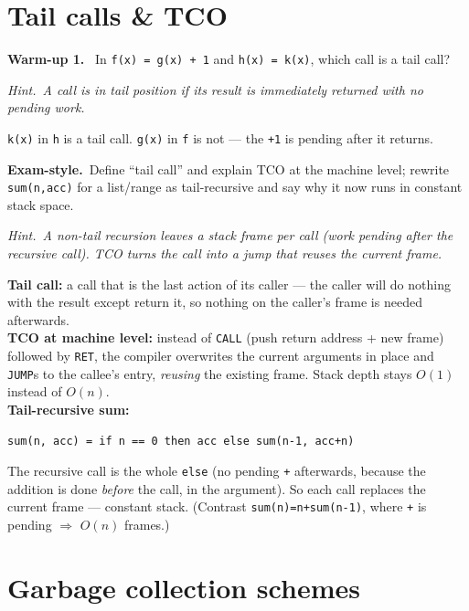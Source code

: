 \documentclass[11pt,a4paper]{article}
\newcommand{\hint}[1]{\par{\small\textcolor{accent}{\textit{Hint.}}\ \textit{#1}}\par\smallskip}
\newcommand{\warm}[1]{\smallskip\textbf{\textcolor{hi}{Warm-up #1.}}\ }
\newcommand{\exam}{\smallskip\textbf{\textcolor{warn}{Exam-style.}}\ }
\begin{document}
\section{Tail calls \& TCO}

\warm{1} In \texttt{f(x) = g(x) + 1} and \texttt{h(x) = k(x)}, which call is a tail call?
\hint{A call is in tail position if its result is \emph{immediately} returned with no pending work.}
\begin{sol}
\texttt{k(x)} in \texttt{h} is a tail call. \texttt{g(x)} in \texttt{f} is not --- the \texttt{+1} is pending after it returns.
\end{sol}

\exam Define ``tail call'' and explain TCO at the machine level; rewrite \texttt{sum(n,acc)} for a list/range as tail-recursive and say why it now runs in constant stack space.
\hint{A non-tail recursion leaves a stack frame per call (work pending after the recursive call). TCO turns the call into a jump that \emph{reuses} the current frame.}
\begin{sol}
\textbf{Tail call:} a call that is the last action of its caller --- the caller will do nothing with the result except return it, so nothing on the caller's frame is needed afterwards.\\[2pt]
\textbf{TCO at machine level:} instead of \texttt{CALL} (push return address + new frame) followed by \texttt{RET}, the compiler overwrites the current arguments in place and \texttt{JUMP}s to the callee's entry, \emph{reusing} the existing frame. Stack depth stays $O(1)$ instead of $O(n)$.\\[2pt]
\textbf{Tail-recursive sum:}
\begin{verbatim}
sum(n, acc) = if n == 0 then acc else sum(n-1, acc+n)
\end{verbatim}
The recursive call is the whole \texttt{else} (no pending \texttt{+} afterwards, because the addition is done \emph{before} the call, in the argument). So each call replaces the current frame --- constant stack. (Contrast \texttt{sum(n)=n+sum(n-1)}, where \texttt{+} is pending $\Rightarrow$ $O(n)$ frames.)
\end{sol}

\section{Garbage collection schemes}
\end{document}
